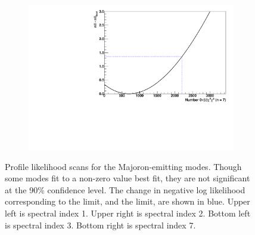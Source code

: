 \documentclass[herrin-thesis.tex]{subfiles}
\begin{document}
\begin{figure}[htp]
\begin{subfigure}[c]{0.48\textwidth}
	\end{subfigure}\hfill%
	\begin{subfigure}[c]{0.48\textwidth}
	\centering
	\includegraphics[width=\textwidth]{./plots/analysis_bb0nX7_profile.pdf}
	\end{subfigure}
\caption[Profile likelihoods for \(0\nu\beta\beta\chi^0(\chi^0)\)]{Profile likelihood scans for the Majoron-emitting modes. Though some modes fit to a non-zero value best fit, they are not significant at the 90\% confidence level. The change in negative log likelihood corresponding to the limit, and the limit, are shown in blue. Upper left is spectral index 1. Upper right is spectral index 2. Bottom left is spectral index 3. Bottom right is spectral index 7.}
\label{fig:analysis_bb0nX_profiles}
\end{figure}
\end{document}
